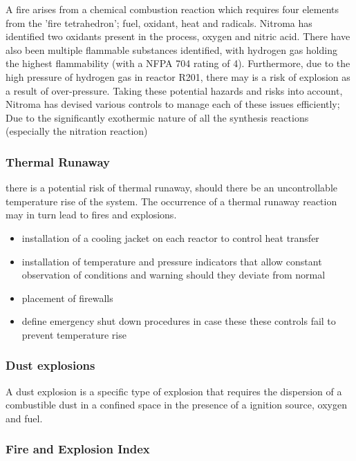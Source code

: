 A fire arises from a chemical combustion reaction which requires four elements from the 'fire tetrahedron'; fuel, oxidant, heat and radicals. Nitroma has identified two oxidants present in the process, oxygen and nitric acid. There have also been multiple flammable substances identified, with hydrogen gas holding the highest flammability (with a NFPA 704 rating of 4). Furthermore, due to the high pressure of hydrogen gas in reactor R201, there may is a risk of explosion as a result of over-pressure. Taking these potential hazards and risks into account, Nitroma has devised various controls to manage each of these issues efficiently; Due to the significantly exothermic nature of all the synthesis reactions (especially the nitration reaction)


\subsubsection{Thermal Runaway}

there is a potential risk of thermal runaway, should there be an uncontrollable temperature rise of the system. The occurrence of a thermal runaway reaction may in turn lead to fires and explosions. 

\begin{itemize}
    \item installation of a cooling jacket on each reactor to control heat transfer
    \item installation of temperature and pressure indicators that allow constant observation of conditions and warning should they deviate from normal
    \item placement of firewalls 
    \item define emergency shut down procedures in case these these controls fail to prevent temperature rise
\end{itemize}


\subsubsection{Dust explosions}

A dust explosion is a specific type of explosion that requires the dispersion of a combustible dust in a confined space in the presence of a ignition source, oxygen and fuel.



\subsubsection{Fire and Explosion Index}




